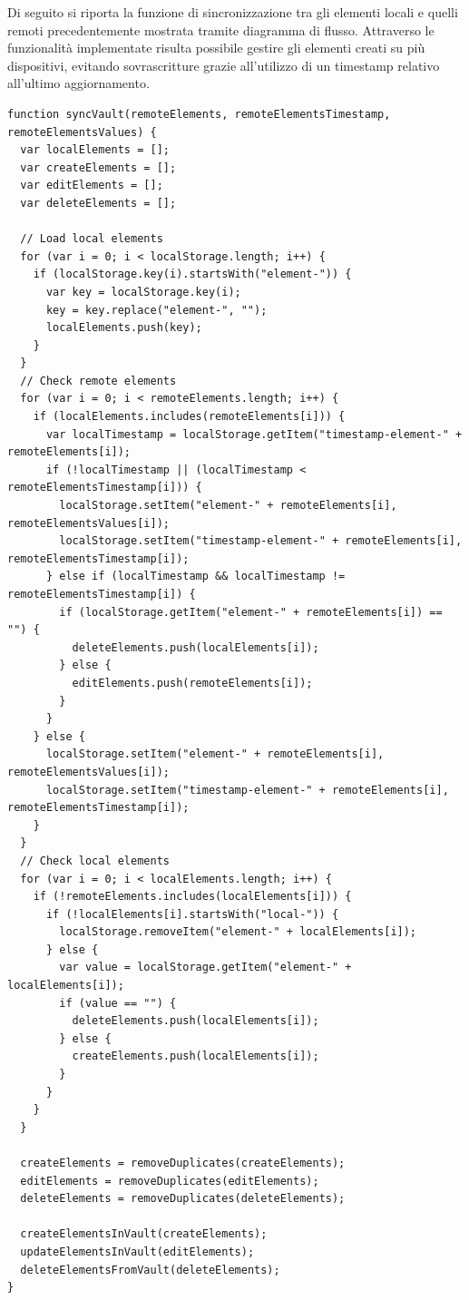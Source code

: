 \documentclass[a4paper]{report}
\begin{document}
Di seguito si riporta la funzione di sincronizzazione tra gli elementi locali e quelli remoti precedentemente mostrata tramite diagramma di flusso. Attraverso le funzionalità implementate risulta possibile gestire gli elementi creati su più dispositivi, evitando sovrascritture grazie all'utilizzo di un timestamp relativo all'ultimo aggiornamento.

\begin{verbatim}
function syncVault(remoteElements, remoteElementsTimestamp, remoteElementsValues) {
  var localElements = [];
  var createElements = [];
  var editElements = [];
  var deleteElements = [];

  // Load local elements
  for (var i = 0; i < localStorage.length; i++) {
    if (localStorage.key(i).startsWith("element-")) {
      var key = localStorage.key(i);
      key = key.replace("element-", "");
      localElements.push(key);
    }
  }
  // Check remote elements
  for (var i = 0; i < remoteElements.length; i++) {
    if (localElements.includes(remoteElements[i])) {
      var localTimestamp = localStorage.getItem("timestamp-element-" + remoteElements[i]);
      if (!localTimestamp || (localTimestamp < remoteElementsTimestamp[i])) {
        localStorage.setItem("element-" + remoteElements[i], remoteElementsValues[i]);
        localStorage.setItem("timestamp-element-" + remoteElements[i], remoteElementsTimestamp[i]);
      } else if (localTimestamp && localTimestamp != remoteElementsTimestamp[i]) {
        if (localStorage.getItem("element-" + remoteElements[i]) == "") {
          deleteElements.push(localElements[i]);
        } else {
          editElements.push(remoteElements[i]);
        }
      }
    } else {
      localStorage.setItem("element-" + remoteElements[i], remoteElementsValues[i]);
      localStorage.setItem("timestamp-element-" + remoteElements[i], remoteElementsTimestamp[i]);
    }
  }
  // Check local elements
  for (var i = 0; i < localElements.length; i++) {
    if (!remoteElements.includes(localElements[i])) {
      if (!localElements[i].startsWith("local-")) {
        localStorage.removeItem("element-" + localElements[i]);
      } else {
        var value = localStorage.getItem("element-" + localElements[i]);
        if (value == "") {
          deleteElements.push(localElements[i]);
        } else {
          createElements.push(localElements[i]);
        }
      }
    }
  }

  createElements = removeDuplicates(createElements);
  editElements = removeDuplicates(editElements);
  deleteElements = removeDuplicates(deleteElements);

  createElementsInVault(createElements);
  updateElementsInVault(editElements);
  deleteElementsFromVault(deleteElements);
}
\end{verbatim}
\end{document}
